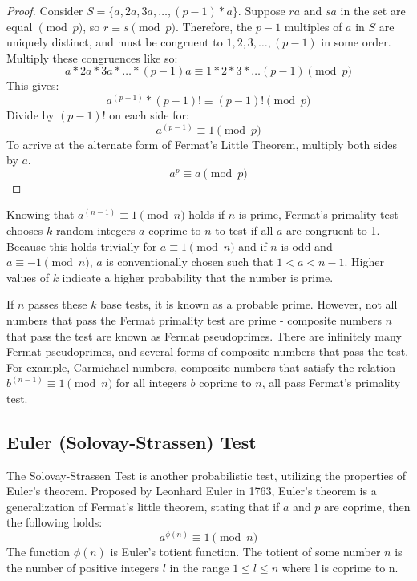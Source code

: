 \documentclass{article}
\begin{document}
\begin{proof} %
Consider $S = \{a, 2a, 3a, \ldots{}, (p - 1) * a\}$.
Suppose $ra$ and $sa$ in the set are equal $\pmod{p}$, so $r \equiv s \pmod{p}$.
Therefore, the $p - 1$ multiples of $a$ in $S$ are uniquely distinct, and must be congruent to ${1, 2, 3, \ldots{}, (p - 1)}$ in some order.
Multiply these congruences like so:
    \[a * 2a * 3a * \ldots{} * (p - 1)a \equiv 1 * 2 * 3 * \ldots{} (p - 1) \pmod{p}\]
This gives:
    \[a^{(p - 1)} * (p - 1)! \equiv (p - 1)! \pmod{p}\]
Divide by $(p - 1)!$ on each side for:
    \[a^{(p - 1)} \equiv 1 \pmod{p}\]
To arrive at the alternate form of Fermat's Little Theorem, multiply both sides by $a$.
    \[a^p \equiv a \pmod{p}\]
\end{proof}

Knowing that $a^{(n - 1)} \equiv 1 \pmod{n}$ holds if $n$ is prime, Fermat's primality test chooses $k$ random integers $a$ coprime to $n$ to test if all $a$ are congruent to 1. Because this holds trivially for $a \equiv 1 \pmod{n}$ and if $n$ is odd and $a \equiv -1 \pmod{n}$, $a$ is conventionally chosen such that $1 < a < n - 1$. Higher values of $k$ indicate a higher probability that the number is prime.

If $n$ passes these $k$ base tests, it is known as a probable prime. However, not all numbers that pass the Fermat primality test are prime - composite numbers $n$ that pass the test are known as Fermat pseudoprimes. There are infinitely many Fermat pseudoprimes, and several forms of composite numbers that pass the test. For example, Carmichael numbers, composite numbers that satisfy the relation $b^{(n-1)} \equiv 1 \pmod{n}$ for all integers $b$ coprime to $n$, all pass Fermat's primality test.

\subsection{Euler (Solovay-Strassen) Test} %
The Solovay-Strassen Test is another probabilistic test, utilizing the properties of Euler's theorem. Proposed by Leonhard Euler in 1763, Euler's theorem is a generalization of Fermat's little theorem, stating that if $a$ and $p$ are coprime, then the following holds:
\[
    a^{\phi(n)} \equiv 1 \pmod{n}
\]
The function $\phi(n)$ is Euler's totient function. The totient of some number $n$ is the number of positive integers $l$ in the range $1 \leq l \leq n$ where l is coprime to n.
\end{document}
